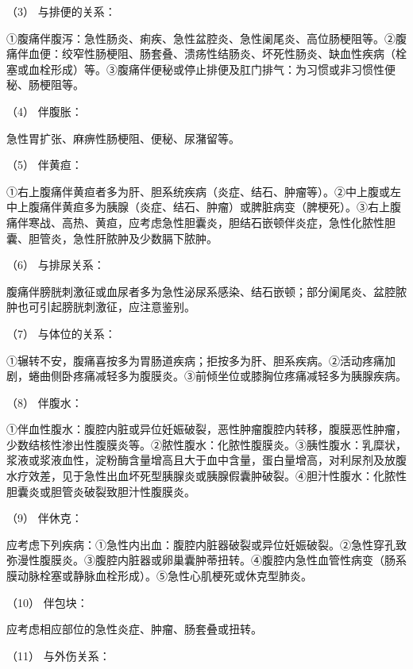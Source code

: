 \hypertarget{text00026.htmlux5cux23CHP1-10-2-1-4-3-3}{}
（3） 与排便的关系：

①腹痛伴腹泻：急性肠炎、痢疾、急性盆腔炎、急性阑尾炎、高位肠梗阻等。②腹痛伴血便：绞窄性肠梗阻、肠套叠、溃疡性结肠炎、坏死性肠炎、缺血性疾病（栓塞或血栓形成）等。③腹痛伴便秘或停止排便及肛门排气：为习惯或非习惯性便秘、肠梗阻等。

\hypertarget{text00026.htmlux5cux23CHP1-10-2-1-4-3-4}{}
（4） 伴腹胀：

急性胃扩张、麻痹性肠梗阻、便秘、尿潴留等。

\hypertarget{text00026.htmlux5cux23CHP1-10-2-1-4-3-5}{}
（5） 伴黄疸：

①右上腹痛伴黄疸者多为肝、胆系统疾病（炎症、结石、肿瘤等）。②中上腹或左中上腹痛伴黄疸多为胰腺（炎症、结石、肿瘤）或脾脏病变（脾梗死）。③右上腹痛伴寒战、高热、黄疸，应考虑急性胆囊炎，胆结石嵌顿伴炎症，急性化脓性胆囊、胆管炎，急性肝脓肿及少数膈下脓肿。

\hypertarget{text00026.htmlux5cux23CHP1-10-2-1-4-3-6}{}
（6） 与排尿关系：

腹痛伴膀胱刺激征或血尿者多为急性泌尿系感染、结石嵌顿；部分阑尾炎、盆腔脓肿也可引起膀胱刺激征，应注意鉴别。

\hypertarget{text00026.htmlux5cux23CHP1-10-2-1-4-3-7}{}
（7） 与体位的关系：

①辗转不安，腹痛喜按多为胃肠道疾病；拒按多为肝、胆系疾病。②活动疼痛加剧，蜷曲侧卧疼痛减轻多为腹膜炎。③前倾坐位或膝胸位疼痛减轻多为胰腺疾病。

\hypertarget{text00026.htmlux5cux23CHP1-10-2-1-4-3-8}{}
（8） 伴腹水：

①伴血性腹水：腹腔内脏或异位妊娠破裂，恶性肿瘤腹腔内转移，腹膜恶性肿瘤，少数结核性渗出性腹膜炎等。②脓性腹水：化脓性腹膜炎。③胰性腹水：乳糜状，浆液或浆液血性，淀粉酶含量增高且大于血中含量，蛋白量增高，对利尿剂及放腹水疗效差，见于急性出血坏死型胰腺炎或胰腺假囊肿破裂。④胆汁性腹水：化脓性胆囊炎或胆管炎破裂致胆汁性腹膜炎。

\hypertarget{text00026.htmlux5cux23CHP1-10-2-1-4-3-9}{}
（9） 伴休克：

应考虑下列疾病：①急性内出血：腹腔内脏器破裂或异位妊娠破裂。②急性穿孔致弥漫性腹膜炎。③腹腔内脏器或卵巢囊肿蒂扭转。④腹腔内急性血管性病变（肠系膜动脉栓塞或静脉血栓形成）。⑤急性心肌梗死或休克型肺炎。

\hypertarget{text00026.htmlux5cux23CHP1-10-2-1-4-3-10}{}
（10） 伴包块：

应考虑相应部位的急性炎症、肿瘤、肠套叠或扭转。

\hypertarget{text00026.htmlux5cux23CHP1-10-2-1-4-3-11}{}
（11） 与外伤关系：

